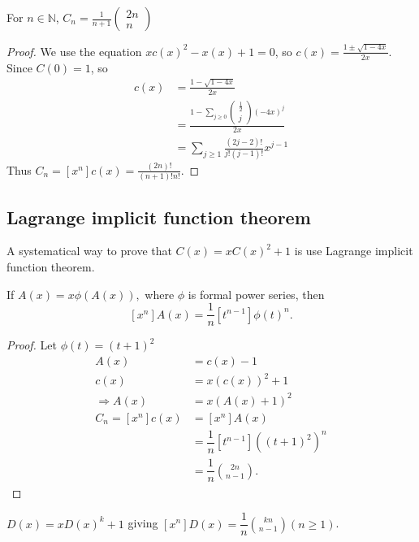 \begin{theorem}
For $n\in \mathbb{N}$, $C_n=\frac{1}{n+1}\begin{pmatrix}
2n\\n
\end{pmatrix}$
\end{theorem}
\begin{proof}
We use the equation $xc(x)^2-x(x)+1=0$, so $c(x)=\frac{1\pm\sqrt{1-4x}}{2x}$. Since $C(0)=1$, so 
\begin{align*}
c(x)&=\frac{1-\sqrt{1-4x}}{2x}\\
&=\frac{1-\sum_{j\geq 0}\begin{pmatrix}
\frac{1}{2}\\j
\end{pmatrix}(-4x)^j}{2x}\\
&=\sum_{j\geq 1}\frac{(2j-2)!}{j!(j-1)!}x^{j-1}
\end{align*}
Thus $C_n=[x^n]c(x)=\frac{(2n)!}{(n+1)!n!}$.
\end{proof}

\subsection{Lagrange implicit function theorem}
A systematical way to prove that $C(x) = x C(x)^2 +1$ is use Lagrange implicit function theorem.   

\begin{theorem}
If $A(x)=x\phi(A(x)),$ where $\phi$ is formal power series, then
$$[x^n]A(x)=\dfrac{1}{n}[t^{n-1}]\phi(t)^n.$$
\end{theorem}

\begin{proof}
Let $\phi(t) = (t+1)^2$
\begin{align*}
A(x) &= c(x)-1\\
c(x) &=x(c(x))^2+1\\
\Rightarrow A(x)&=x(A(x)+1)^2\\
C_n=[x^n]c(x)&=[x^n]A(x)\\
&=\dfrac{1}{n}[t^{n-1}]((t+1)^2)^n\\
&=\dfrac{1}{n}{2n \choose n-1}.
\end{align*}
\end{proof}

\begin{remark}
$D(x)=xD(x)^k+1$ giving $[x^n]D(x)=\dfrac{1}{n}{kn \choose n-1}(n\geq 1)$.
\end{remark}

